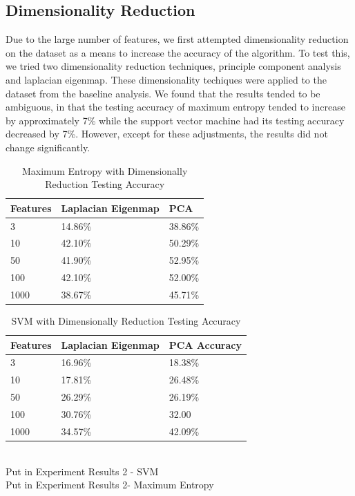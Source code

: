 \subsection{Dimensionality Reduction}
Due to the large number of features, we first attempted dimensionality reduction on the dataset as a means to increase the accuracy of the algorithm.  To test this, we tried two dimensionality reduction techniques, principle component analysis and laplacian eigenmap.  These dimensionality techiques were applied to the dataset from the baseline analysis.  We found that the results tended to be ambiguous, in that the testing accuracy of maximum entropy tended to increase by approximately 7\% while the support vector machine had its testing accuracy decreased by 7\%.  However, except for these adjustments, the results did not change significantly.
\\
\begin{table}[!Ht]
\caption{Maximum Entropy with Dimensionally Reduction Testing Accuracy}
\centering
\begin{tabular}[!Ht]{| l | l | l |}
\hline
Features & Laplacian Eigenmap & PCA \\ \hline
3 & 14.86\% & 38.86\% \\ \hline
10 & 42.10\% & 50.29\% \\ \hline
50 & 41.90\% &  52.95\% \\ \hline
100 & 42.10\% & 52.00\%	 \\ \hline
1000 & 38.67\% & 45.71\% \\ \hline
\end{tabular}
\end{table}
\begin{table}[H!]
\caption{SVM with Dimensionally Reduction Testing Accuracy}
\centering
\begin{tabular}{| l | l | l |}
\hline
Features & Laplacian Eigenmap & PCA Accuracy \\ \hline
3 & 16.96\% & 18.38\% \\ \hline
10 & 17.81\% & 26.48\% \\ \hline
50 & 26.29\% & 26.19\% \\ \hline
100 & 30.76\% & 32.00 \\ \hline
1000 & 34.57\% & 42.09\% \\ \hline
\end{tabular}
\end{table}
\\ Put in Experiment Results 2 - SVM
\\ Put in Experiment Results 2- Maximum Entropy

